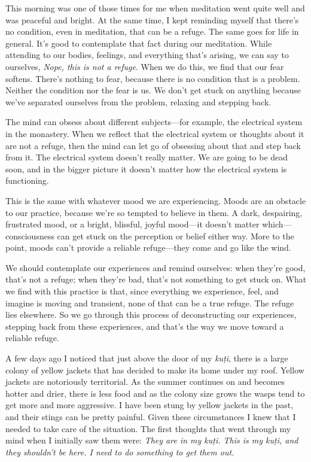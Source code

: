 
This morning was one of those times for me when meditation went quite 
well and was peaceful and bright. At the same time, I kept reminding 
myself that there's no condition, even in meditation, that can be a 
refuge. The same goes for life in general. It's good to contemplate 
that fact during our meditation. While attending to our bodies, 
feelings, and everything that's arising, we can say to ourselves, 
\emph{Nope, this is not a refuge}. When we do this, we find that our 
fear softens. There's nothing to fear, because there is no condition 
that is a problem. Neither the condition nor the fear is us. We don't 
get stuck on anything because we've separated ourselves from the 
problem, relaxing and stepping back.

The mind can obsess about different subjects---for example, the 
electrical system in the monastery. When we reflect that the electrical 
system or thoughts about it are not a refuge, then the mind can let go 
of obsessing about that and step back from it. The electrical system 
doesn't really matter. We are going to be dead soon, and in the bigger 
picture it doesn't matter how the electrical system is functioning.

This is the same with whatever mood we are experiencing. Moods are an 
obstacle to our practice, because we're so tempted to believe in them. 
A dark, despairing, frustrated mood, or a bright, blissful, joyful 
mood---it doesn't matter which---consciousness can get stuck on the 
perception or belief either way. More to the point, moods can't provide 
a reliable refuge---they come and go like the wind.

We should contemplate our experiences and remind ourselves: when 
they're good, that's not a refuge; when they're bad, that's not 
something to get stuck on. What we find with this practice is that, 
since everything we experience, feel, and imagine is moving and 
transient, none of that can be a true refuge. The refuge lies 
elsewhere. So we go through this process of deconstructing our 
experiences, stepping back from these experiences, and that's the way 
we move toward a reliable refuge.


A few days ago I noticed that just above the door of my \emph{kuṭi}, 
there is a large colony of yellow jackets that has decided to make its 
home under my roof. Yellow jackets are notoriously territorial. As the 
summer continues on and becomes hotter and drier, there is less food 
and as the colony size grows the wasps tend to get more and more 
aggressive. I have been stung by yellow jackets in the past, and their 
stings can be pretty painful. Given these circumstances I knew that I 
needed to take care of the situation. The first thoughts that went 
through my mind when I initially saw them were: \emph{They are in my 
kuṭi. This is my kuṭi, and they shouldn't be here. I need to do 
something to get them out.}

